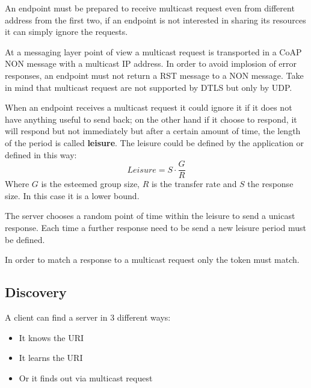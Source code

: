 	An endpoint must be prepared to receive multicast request even from different address from the first two, if an endpoint is not interested in sharing its resources it can simply ignore the requests.\newline
	
	At a messaging layer point of view a multicast request is transported in a CoAP NON message with a multicast IP address.\newline
	In order to avoid implosion of error responses, an endpoint must not return a RST message to a NON message.\newline
	Take in mind that multicast request are not supported by DTLS but only by UDP.\newline
	
	When an endpoint receives a multicast request it could ignore it if it does not have anything useful to send back; on the other hand if it choose to respond, it will respond but not immediately but after a certain amount of time, the length of the period is called \textbf{leisure}.\newline
	The leisure could be defined by the application or defined in this way:
	\begin{equation}Leisure=S\cdot\frac{G}{R}\end{equation}
	Where $G$ is the esteemed group size, $R$ is the transfer rate and $S$ the response size.\newline
	In this case it is a lower bound.\newline
	
	The server chooses a random point of time within the leisure to send a unicast response.\newline
	Each time a further response need to be send a new leisure period must be defined.\newline
	
	In order to match a response to a multicast request only the token must match.\newline
	
	\subsection{Discovery}
	A client can find a server in 3 different ways:
	\begin{itemize}
		\item It knows the URI
		\item It learns the URI
		\item Or it finds out via multicast request
	\end{itemize}


